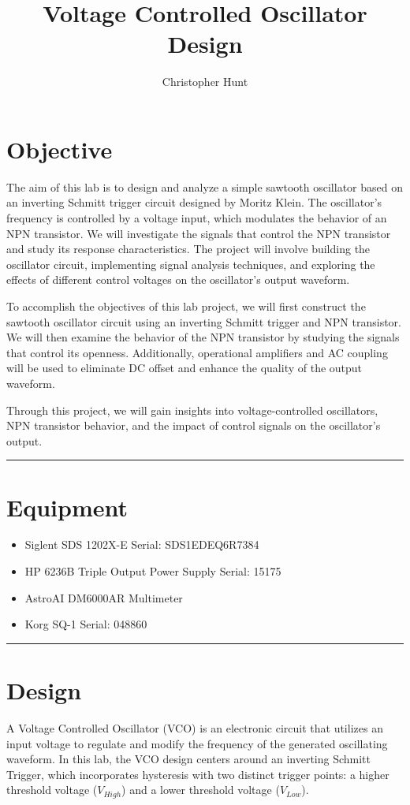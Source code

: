 \documentclass{article}
\title{\textbf{{\huge Voltage Controlled Oscillator Design}}}
\author{Christopher Hunt}
\date{}
\begin{document}
\pagestyle{fancy}
\fancyhf{}
\rhead{\thepage}
\maketitle
\section*{\textcolor{mycolor}{Objective}}
The aim of this lab is to design and analyze a simple sawtooth oscillator based on an inverting Schmitt trigger circuit designed by Moritz Klein. The oscillator's frequency is controlled by a voltage input, which modulates the behavior of an NPN transistor. We will investigate the signals that control the NPN transistor and study its response characteristics. The project will involve building the oscillator circuit, implementing signal analysis techniques, and exploring the effects of different control voltages on the oscillator's output waveform.

To accomplish the objectives of this lab project, we will first construct the sawtooth oscillator circuit using an inverting Schmitt trigger and NPN transistor. We will then examine the behavior of the NPN transistor by studying the signals that control its openness. Additionally, operational amplifiers and AC coupling will be used to eliminate DC offset and enhance the quality of the output waveform.

Through this project, we will gain insights into voltage-controlled oscillators, NPN transistor behavior, and the impact of control signals on the oscillator's output.
\vspace{5mm}
\hrule

\section*{\textcolor{mycolor}{Equipment}}
\begin{itemize}
  \item Siglent SDS 1202X-E Serial: SDS1EDEQ6R7384
  \item HP 6236B Triple Output Power Supply Serial: 15175
  \item AstroAI DM6000AR Multimeter
  \item Korg SQ-1 Serial: 048860
\end{itemize}
\vspace{5mm}
\hrule

\section*{\textcolor{mycolor}{Design}}
A Voltage Controlled Oscillator (VCO) is an electronic circuit that utilizes an input voltage to regulate and modify the frequency of the generated oscillating waveform. In this lab, the VCO design centers around an inverting Schmitt Trigger, which incorporates hysteresis with two distinct trigger points: a higher threshold voltage ($V_{High}$) and a lower threshold voltage ($V_{Low}$).
\end{document}
